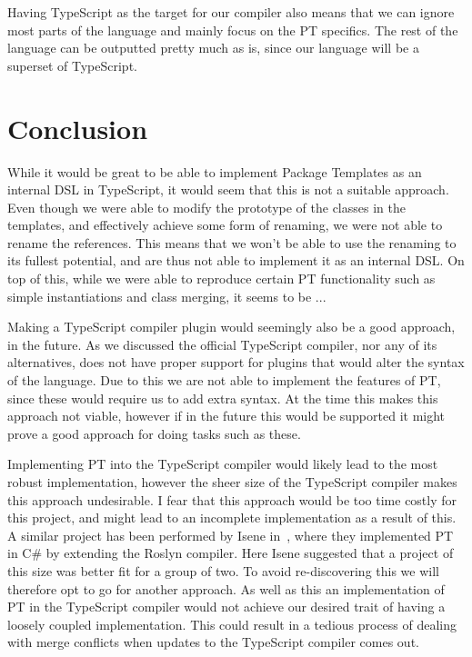 Having TypeScript as the target for our compiler also means that we can ignore most parts of the language and mainly focus on the PT specifics.
The rest of the language can be outputted pretty much as is, since our language will be a superset of TypeScript.


\section{Conclusion}\label{sec:planning-conclusion}


While it would be great to be able to implement Package Templates as an internal DSL in TypeScript, it would seem that this is not a suitable approach.
Even though we were able to modify the prototype of the classes in the templates, and effectively achieve some form of renaming, we were not able to rename the references.
This means that we won't be able to use the renaming to its fullest potential, and are thus not able to implement it as an internal DSL\@.
On top of this, while we were able to reproduce certain PT functionality such as simple instantiations and class merging, it seems to be ... %

Making a TypeScript compiler plugin would seemingly also be a good approach, in the future.
As we discussed the official TypeScript compiler, nor any of its alternatives, does not have proper support for plugins that would alter the syntax of the language.
Due to this we are not able to implement the features of PT, since these would require us to add extra syntax.
At the time this makes this approach not viable, however if in the future this would be supported it might prove a good approach for doing tasks such as these.

Implementing PT into the TypeScript compiler would likely lead to the most robust implementation, however the sheer size of the TypeScript compiler makes this approach undesirable.
I fear that this approach would be too time costly for this project, and might lead to an incomplete implementation as a result of this.
A similar project has been performed by Isene in~\cite{Isene2018}, where they implemented PT in C\# by extending the Roslyn compiler.
Here Isene suggested that a project of this size was better fit for a group of two.
To avoid re-discovering this we will therefore opt to go for another approach.
As well as this an implementation of PT in the TypeScript compiler would not achieve our desired trait of having a loosely coupled implementation.
This could result in a tedious process of dealing with merge conflicts when updates to the TypeScript compiler comes out.


